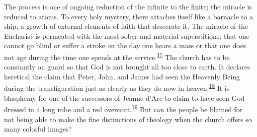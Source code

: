 \protect\hypertarget{13_Chapter_Six__THE_DEPICTION_OF_TH.xhtmlux5cux23page_177}{}{}The
process is one of ongoing reduction of the infinite to the finite; the
miracle is reduced to atoms. To every holy mystery, there attaches
itself like a barnacle to a ship, a growth of external elements of faith
that desecrate it. The miracle of the Eucharist is permeated with the
most sober and material superstitions: that one cannot go blind or
suffer a stroke on the day one hears a mass or that one does not age
during the time one spends at the
service.\textsuperscript{\protect\hypertarget{13_Chapter_Six__THE_DEPICTION_OF_TH.xhtmlux5cux23id_1237}{\protect\hyperlink{23_NOTES.xhtmlux5cux23id_1238}{17}}}
The church has to be constantly on guard so that God is not brought all
too close to earth. It declares heretical the claim that Peter, John,
and James had seen the Heavenly Being during the transfiguration just as
clearly as they do now in
heaven.\textsuperscript{\protect\hypertarget{13_Chapter_Six__THE_DEPICTION_OF_TH.xhtmlux5cux23id_1235}{\protect\hyperlink{23_NOTES.xhtmlux5cux23id_1236}{18}}}
It is blasphemy for one of the successors of Jeanne d'Arc to claim to
have seen God dressed in a long robe and a red
overcoat.\textsuperscript{\protect\hypertarget{13_Chapter_Six__THE_DEPICTION_OF_TH.xhtmlux5cux23id_1233}{\protect\hyperlink{23_NOTES.xhtmlux5cux23id_1234}{19}}}
But can the people be blamed for not being able to make the fine
distinctions of theology when the church offers so many colorful images?

